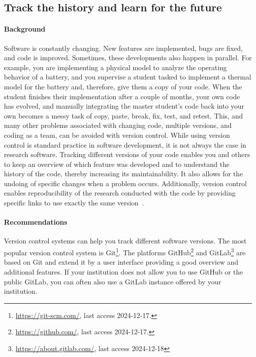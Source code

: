 \subsection{Track the history and learn for the future}\label{sec:vcs}

\paragraph{Background} Software is constantly changing. New features are implemented, bugs are fixed, and code is improved. Sometimes, these developments also happen in parallel. For example, you are implementing a physical model to analyze the operating behavior of a battery, and you supervise a student tasked to implement a thermal model for the battery and, therefore, give them a copy of your code. When the student finishes their implementation after a couple of months, your own code has evolved, and manually integrating the master student’s code back into your own becomes a messy task of copy, paste, break, fix, test, and retest. This, and many other problems associated with changing code, multiple versions, and coding as a team, can be avoided with version control. While using version control is standard practice in software development, it is not always the case in research software. Tracking different versions of your code enables you and others to keep an overview of which feature was developed and to understand the history of the code, thereby increasing its maintainability. It also allows for the undoing of specific changes when a problem occurs. Additionally, version control enables reproducibility of the research conducted with the code by providing specific links to use  exactly the same version~\cite{sandve2013ten}.

\paragraph{Recommendations} Version control systems can help you track different software versions. The most popular version control system is Git\footnote{\url{https://git-scm.com/}, last access 2024-12-17.}.
The platforms GitHub\footnote{\url{https://github.com/}, last access 2024-12-17.} and GitLab\footnote{\url{https://about.gitlab.com/}, last access 2024-12-18} are based on Git and extend it by a user interface providing a good overview and additional features. If your institution does not allow you to use GitHub or the public GitLab, you can often also use a GitLab instance offered by your institution.


